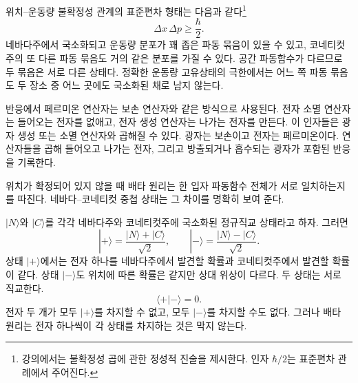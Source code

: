\begin{classroomqa}
\end{classroomqa}

위치--운동량 불확정성 관계의 표준편차 형태는 다음과 같다\footnote{강의에서는 불확정성 곱에 관한 정성적 진술을 제시한다. 인자 \(\hbar/2\)는 표준편차 관례에서 주어진다.}
\begin{equation}
\Delta x\,\Delta p\geq\frac{\hbar}{2}.
\end{equation}
네바다주에서 국소화되고 운동량 분포가 꽤 좁은 파동 묶음이 있을 수 있고, 코네티컷주의 또 다른 파동 묶음도 거의 같은 분포를 가질 수 있다. 공간 파동함수가 다르므로 두 묶음은 서로 다른 상태다. 정확한 운동량 고유상태의 극한에서는 어느 쪽 파동 묶음도 두 장소 중 어느 곳에도 국소화된 채로 남지 않는다.

반응에서 페르미온 연산자는 보손 연산자와 같은 방식으로 사용된다. 전자 소멸 연산자는 들어오는 전자를 없애고, 전자 생성 연산자는 나가는 전자를 만든다. 이 인자들은 광자 생성 또는 소멸 연산자와 곱해질 수 있다. 광자는 보손이고 전자는 페르미온이다. 연산자들을 곱해 들어오고 나가는 전자, 그리고 방출되거나 흡수되는 광자가 포함된 반응을 기록한다.

\begin{classroomqa}
\end{classroomqa}


위치가 확정되어 있지 않을 때 배타 원리는 한 입자 파동함수 전체가 서로 일치하는지를 따진다. 네바다--코네티컷 중첩 상태는 그 차이를 명확히 보여 준다.

\(|N\rangle\)와 \(|C\rangle\)를 각각 네바다주와 코네티컷주에 국소화된 정규직교 상태라고 하자. 그러면
\begin{equation}
|+\rangle=\frac{|N\rangle+|C\rangle}{\sqrt2},
\qquad
|-\rangle=\frac{|N\rangle-|C\rangle}{\sqrt2}.
\end{equation}
상태 \(|+\rangle\)에서는 전자 하나를 네바다주에서 발견할 확률과 코네티컷주에서 발견할 확률이 같다. 상태 \(|-\rangle\)도 위치에 따른 확률은 같지만 상대 위상이 다르다. 두 상태는 서로 직교한다.
\begin{equation}
\langle+|-\rangle=0.
\end{equation}
전자 두 개가 모두 \(|+\rangle\)를 차지할 수 없고, 모두 \(|-\rangle\)를 차지할 수도 없다. 그러나 배타 원리는 전자 하나씩이 각 상태를 차지하는 것은 막지 않는다.

